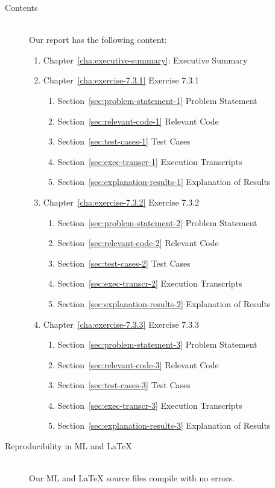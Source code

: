 \documentclass{report}
\begin{document}
\begin{description}
\item[Contents] \ \\
Our report has the following content:
\begin{enumerate}
 \item Chapter~\ref{cha:executive-summary}: Executive Summary
 \item Chapter~\ref{cha:exercise-7.3.1} Exercise 7.3.1
   \begin{enumerate}
    \item Section~\ref{sec:problem-statement-1} Problem Statement
    \item Section~\ref{sec:relevant-code-1} Relevant Code
     \item Section~\ref{sec:test-cases-1} Test Cases
    \item Section~\ref{sec:exec-transcr-1} Execution Transcripts
    \item Section~\ref{sec:explanation-results-1} Explanation of Results
   \end{enumerate}
 \item Chapter~\ref{cha:exercise-7.3.2} Exercise 7.3.2
   \begin{enumerate}
    \item Section~\ref{sec:problem-statement-2} Problem Statement
    \item Section~\ref{sec:relevant-code-2} Relevant Code
     \item Section~\ref{sec:test-cases-2} Test Cases
    \item Section~\ref{sec:exec-transcr-2} Execution Transcripts
    \item Section~\ref{sec:explanation-results-2} Explanation of Results
   \end{enumerate}
 \item Chapter~\ref{cha:exercise-7.3.3} Exercise 7.3.3
   \begin{enumerate}
    \item Section~\ref{sec:problem-statement-3} Problem Statement
    \item Section~\ref{sec:relevant-code-3} Relevant Code
    \item Section~\ref{sec:test-cases-3} Test Cases
    \item Section~\ref{sec:exec-transcr-3} Execution Transcripts
    \item Section~\ref{sec:explanation-results-3} Explanation of Results
   \end{enumerate}
\end{enumerate}
\item[Reproducibility in ML and \LaTeX{}] \ \\
 Our ML and \LaTeX{} source files compile with no errors.
\end{description}
\end{document}
